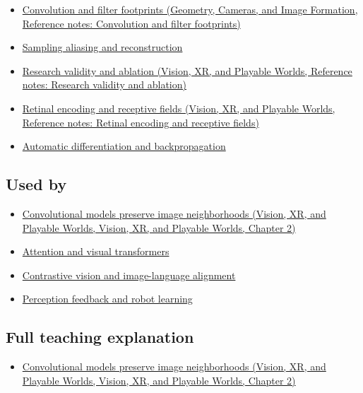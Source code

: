 \begin{itemize}
\tightlist
\item
  \href{../03-Geometry-Cameras-and-Image-Formation/main.pdf\#nameddest=appendix-d5b3c692d9f0}{Convolution and filter footprints (Geometry, Cameras, and Image Formation, Reference notes: Convolution and filter footprints)}
\item
  \hyperref[appendix-6a7869dd79a6]{Sampling aliasing and reconstruction}
\item
  \href{../07-Vision-XR-and-Playable-Worlds/main.pdf\#nameddest=appendix-65788587ef78}{Research validity and ablation (Vision, XR, and Playable Worlds, Reference notes: Research validity and ablation)}
\item
  \href{../07-Vision-XR-and-Playable-Worlds/main.pdf\#nameddest=appendix-7281c15ac44a}{Retinal encoding and receptive fields (Vision, XR, and Playable Worlds, Reference notes: Retinal encoding and receptive fields)}
\item
  \hyperref[appendix-40df0855b4a7]{Automatic differentiation and backpropagation}
\end{itemize}

\subsection{Used by}\label{appendix-47c51ea026fb-used-by}

\begin{itemize}
\tightlist
\item
  \href{../07-Vision-XR-and-Playable-Worlds/main.pdf\#nameddest=04-visual-computing-ii-ch031-convolutional-models-preserve-image-neighborhoods}{Convolutional models preserve image neighborhoods (Vision, XR, and Playable Worlds, Vision, XR, and Playable Worlds, Chapter 2)}
\item
  \hyperref[appendix-a9d5dfdd164a]{Attention and visual transformers}
\item
  \hyperref[appendix-772f1fd96148]{Contrastive vision and image-language alignment}
\item
  \hyperref[appendix-b0c42da325f1]{Perception feedback and robot learning}
\end{itemize}

\subsection{Full teaching explanation}\label{appendix-47c51ea026fb-full-teaching-explanation}

\begin{itemize}
\tightlist
\item
  \href{../07-Vision-XR-and-Playable-Worlds/main.pdf\#nameddest=04-visual-computing-ii-ch031-convolutional-models-preserve-image-neighborhoods}{Convolutional models preserve image neighborhoods (Vision, XR, and Playable Worlds, Vision, XR, and Playable Worlds, Chapter 2)}
\end{itemize}

